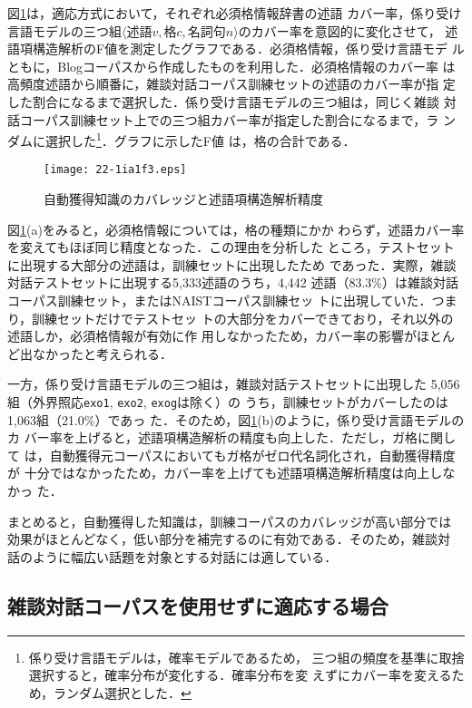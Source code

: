 \documentclass[japanese]{jnlp_1.4}
\begin{document}
図\ref{fig-coverages}は，適応方式において，それぞれ必須格情報辞書の述語
カバー率，係り受け言語モデルの三つ組$\langle \textrm{述語}v,
\textrm{格}c, \textrm{名詞句}n \rangle$のカバー率を意図的に変化させて，
述語項構造解析のF値を測定したグラフである．必須格情報，係り受け言語モデ
ルともに，Blogコーパスから作成したものを利用した．必須格情報のカバー率
は高頻度述語から順番に，雑談対話コーパス訓練セットの述語のカバー率が指
定した割合になるまで選択した．係り受け言語モデルの三つ組は，同じく雑談
対話コーパス訓練セット上での三つ組カバー率が指定した割合になるまで，ラ
ンダムに選択した\footnote{係り受け言語モデルは，確率モデルであるため，
三つ組の頻度を基準に取捨選択すると，確率分布が変化する．確率分布を変
えずにカバー率を変えるため，ランダム選択とした．}．グラフに示したF値
は，格の合計である．

\begin{figure}[t]
\begin{center}
\texttt{[image: 22-1ia1f3.eps]}
\end{center}
\caption{自動獲得知識のカバレッジと述語項構造解析精度}
\label{fig-coverages}
\end{figure}

図\ref{fig-coverages}(a)をみると，必須格情報については，格の種類にかか
わらず，述語カバー率を変えてもほぼ同じ精度となった．この理由を分析した
ところ，テストセットに出現する大部分の述語は，訓練セットに出現したため
であった．実際，雑談対話テストセットに出現する5,333述語のうち，4,442 
述語（83.3\%）は雑談対話コーパス訓練セット，またはNAISTコーパス訓練セッ
トに出現していた．つまり，訓練セットだけでテストセッ
トの大部分をカバーできており，それ以外の述語しか，必須格情報が有効に作
用しなかったため，カバー率の影響がほとんど出なかったと考えられる．

一方，係り受け言語モデルの三つ組は，雑談対話テストセットに出現した
5,056組（外界照応\texttt{exo1}, \texttt{exo2}, \texttt{exog}は除く）の
うち，訓練セットがカバーしたのは1,063組（21.0\%）であっ
た．そのため，図\ref{fig-coverages}(b)のように，係り受け言語モデルのカ
バー率を上げると，述語項構造解析の精度も向上した．ただし，ガ格に関して
は，自動獲得元コーパスにおいてもガ格がゼロ代名詞化され，自動獲得精度が
十分ではなかったため，カバー率を上げても述語項構造解析精度は向上しなかっ
た．

まとめると，自動獲得した知識は，訓練コーパスのカバレッジが高い部分では
効果がほとんどなく，低い部分を補完するのに有効である．そのため，雑談対
話のように幅広い話題を対象とする対話には適している．


\subsection{雑談対話コーパスを使用せずに適応する場合}
\end{document}
